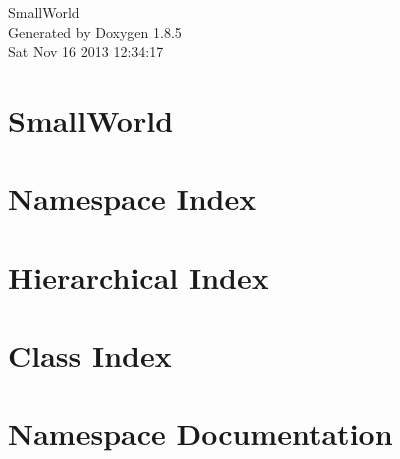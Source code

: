 \documentclass[twoside]{book}
\newcommand{\clearemptydoublepage}{%
  \newpage{\pagestyle{empty}\cleardoublepage}%
}
\begin{document}
\hypersetup{pageanchor=false}
\begin{titlepage}
\vspace*{7cm}
\begin{center}%
{\Large Small\-World }\\
\vspace*{1cm}
{\large Generated by Doxygen 1.8.5}\\
\vspace*{0.5cm}
{\small Sat Nov 16 2013 12:34:17}\\
\end{center}
\end{titlepage}
\clearemptydoublepage
\tableofcontents
\clearemptydoublepage
{}
\hypersetup{pageanchor=true}

\chapter{Small\-World}
\label{md__c_1__users_damienc__documents__git_hub__small_world__r_e_a_d_m_e}
\hypertarget{md__c_1__users_damienc__documents__git_hub__small_world__r_e_a_d_m_e}{}

\chapter{Namespace Index}

\chapter{Hierarchical Index}

\chapter{Class Index}

\chapter{Namespace Documentation}


\end{document}
